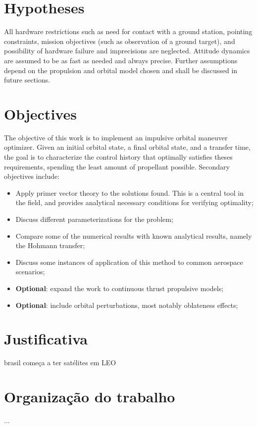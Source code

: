 \section{Hypotheses}

All hardware restrictions such as need for contact with a ground station, pointing constraints, mission objectives (such as observation of a ground target), and possibility of hardware failure and imprecisions are neglected. Attitude dynamics are assumed to be as fast as needed and always precise. Further assumptions depend on the propulsion and orbital model chosen and shall be discussed in future sections.

\section{Objectives}

The objective of this work is to implement an impulsive orbital maneuver optimizer. Given an initial orbital state, a final orbital state, and a transfer time, the goal is to characterize the control history that optimally satisfies theses requirements, spending the least amount of propellant possible. Secondary objectives include:
\begin{itemize}
    \item Apply primer vector theory to the solutions found. This is a central tool in the field, and provides analytical necessary conditions for verifying optimality;
    \item Discuss different parameterizations for the problem;
    \item Compare some of the numerical results with known analytical results, namely the Hohmann transfer;
    \item Discuss some instances of application of this method to common aerospace scenarios;
    \item \textbf{Optional}: expand the work to continuous thrust propulsive models;
    \item \textbf{Optional}: include orbital perturbations, most notably oblateness effects;
\end{itemize}

\section{Justificativa}

brasil começa a ter satélites em LEO

\section{Organização do trabalho}

...